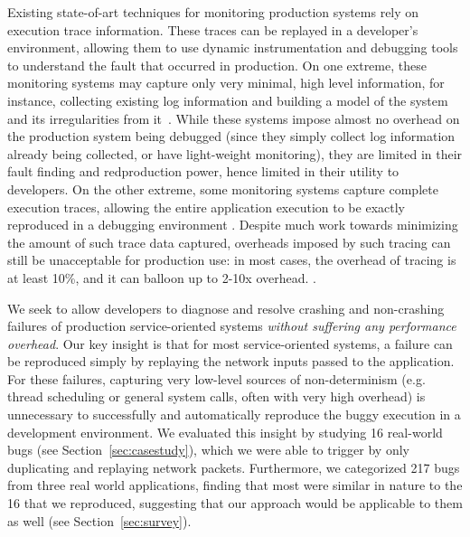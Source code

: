 Existing state-of-art techniques for monitoring production systems rely on execution trace information. 
These traces can be replayed in a developer's environment, allowing them to use dynamic instrumentation and debugging tools to understand the fault that occurred in production.
On one extreme, these monitoring systems may capture only very minimal, high
level information, for instance, collecting existing log information and
building a model of the system and its irregularities from it~\cite{magpie,fay,failuresketching,problemsolvingSysTap}. 
While these systems impose almost no overhead on the production system being
debugged (since they simply collect log information already being collected, or
have light-weight monitoring), they are limited in their fault finding and redproduction power, hence limited in their utility to developers.
On the other extreme, some monitoring systems capture complete execution traces, allowing the entire application execution to be exactly reproduced in a debugging environment \cite{odr,revirt,laadan2010transparent,geels2007friday}.
Despite much work towards minimizing the amount of such trace data captured, overheads imposed by such tracing can still be unacceptable for production use: in most cases, the overhead of tracing is at least 10\%, and it can balloon up to 2-10x overhead. \cite{pinplay,drdebug}.

We seek to allow developers to diagnose and resolve crashing and non-crashing failures of production service-oriented systems \emph{without suffering any performance overhead}.
Our key insight is that for most service-oriented systems, a failure can be reproduced simply by replaying the network inputs passed to the application.
For these failures, capturing very low-level sources of non-determinism (e.g. thread scheduling or general system calls, often with very high overhead) is unnecessary to successfully and automatically reproduce the buggy execution in a development environment.
We evaluated this insight by studying 16 real-world bugs (see Section~\ref{sec:casestudy}), which we were able to trigger by only duplicating and replaying network packets.
Furthermore, we categorized 217 bugs from three real world applications, finding that most were similar in nature to the 16 that we reproduced, suggesting that our approach would be applicable to them as well (see Section~\ref{sec:survey}).


